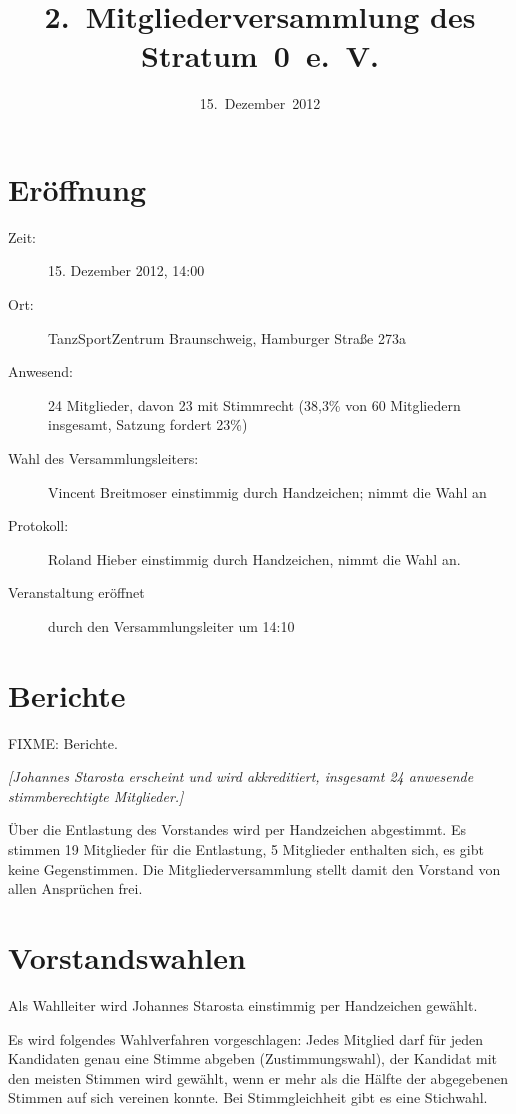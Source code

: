 \documentclass[a4paper,12pt]{scrartcl}
\title{2.~Mitgliederversammlung des Stratum~0~e.~V.}
\date{15.~Dezember~2012}
\begin{document}
\maketitle
\tableofcontents

\section{Eröffnung}
\begin{description}
  \item[Zeit:] 15. Dezember 2012, 14:00
  \item[Ort:] TanzSportZentrum Braunschweig, Hamburger Straße 273a
  \item[Anwesend:] 24 Mitglieder, davon 23 mit Stimmrecht (38{,}3\% von 60
    Mitgliedern insgesamt, Satzung fordert 23\%)
  \item[Wahl des Versammlungsleiters:] Vincent Breitmoser einstimmig durch
    Handzeichen; nimmt die Wahl an
  \item[Protokoll:] Roland Hieber einstimmig durch Handzeichen, nimmt die Wahl
    an.
  \item[Veranstaltung eröffnet] durch den Versammlungsleiter um 14:10
\end{description}

\section{Berichte}
FIXME: Berichte.

\emph{[Johannes Starosta erscheint und wird akkreditiert, insgesamt 24 anwesende
stimmberechtigte Mitglieder.]}

Über die Entlastung des Vorstandes wird per Handzeichen abgestimmt. Es stimmen
19 Mitglieder für die Entlastung, 5 Mitglieder enthalten sich, es gibt keine
Gegenstimmen. Die Mitgliederversammlung stellt damit den Vorstand von allen
Ansprüchen frei.

\section{Vorstandswahlen}
Als Wahlleiter wird Johannes Starosta einstimmig per Handzeichen gewählt.

Es wird folgendes Wahlverfahren vorgeschlagen: Jedes Mitglied darf für jeden
Kandidaten genau eine Stimme abgeben (Zustimmungswahl), der Kandidat mit den
meisten Stimmen wird gewählt, wenn er mehr als die Hälfte der abgegebenen
Stimmen auf sich vereinen konnte. Bei Stimmgleichheit gibt es eine Stichwahl.
\end{document}
